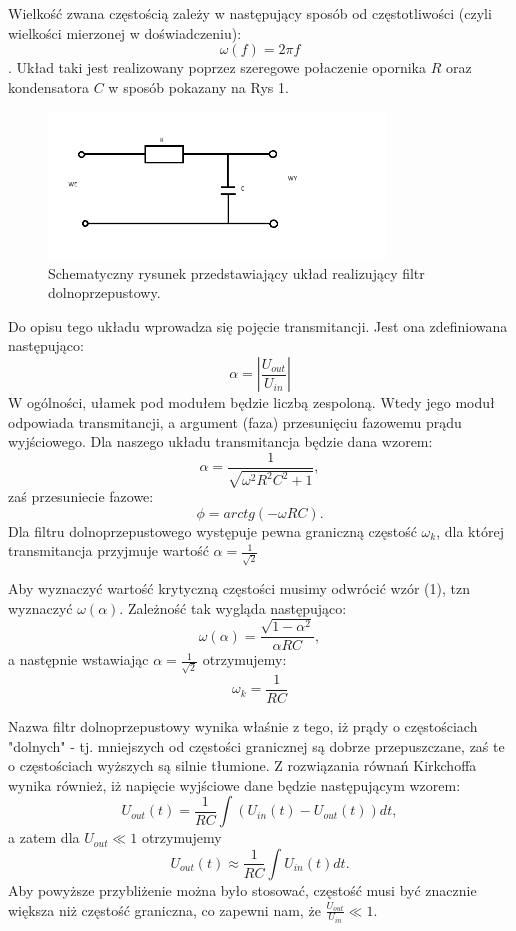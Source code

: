\documentclass[10pt,a4paper]{article}
\begin{document}
Wielkość zwana częstością zależy w następujący sposób od częstotliwości (czyli wielkości mierzonej w doświadczeniu):
$$ \omega (f) = 2 \pi f$$.
Układ taki jest realizowany poprzez szeregowe połaczenie opornika $R$ oraz kondensatora $C$ w sposób pokazany na Rys 1.
\begin{figure}[ht!]	
	\begin{center}
		\includegraphics[width = 0.8\textwidth]{uklad.png}
		\caption{Schematyczny rysunek przedstawiający układ realizujący filtr dolnoprzepustowy.}
	\end{center}
\end{figure}

Do opisu tego układu wprowadza się pojęcie transmitancji. Jest ona zdefiniowana następująco:
$$ \alpha = |\frac{U_{out}}{U_{in}}| $$
W ogólności, ułamek pod modułem będzie liczbą zespoloną. Wtedy jego moduł odpowiada transmitancji, a argument (faza) przesunięciu fazowemu prądu wyjściowego. Dla naszego układu transmitancja będzie dana wzorem:
\begin{equation}
\alpha = \frac{1}{\sqrt{\omega^2R^2C^2 + 1} } ,
\end{equation} 
zaś przesuniecie fazowe:
\begin{equation}
 \phi = arctg(-\omega RC). 
\end{equation}
Dla filtru dolnoprzepustowego występuje pewna graniczną częstość $\omega_k$, dla której transmitancja przyjmuje wartość $\alpha = \frac{1}{\sqrt{2}} $

Aby wyznaczyć wartość krytyczną częstości musimy odwrócić wzór (1), tzn wyznaczyć $\omega (\alpha)$. Zależność tak wygląda następująco:
$$ \omega (\alpha) = \frac{\sqrt{1-\alpha^2}}{\alpha RC}, $$ a następnie 
wstawiając $\alpha = \frac{1}{\sqrt{2}}$ otrzymujemy:
\begin{equation} \omega_k = \frac{1}{RC} \end{equation}


Nazwa filtr dolnoprzepustowy wynika właśnie z tego, iż prądy o częstościach "dolnych" - tj. mniejszych od częstości granicznej są dobrze przepuszczane, zaś te o częstościach wyższych są silnie tłumione.
Z rozwiązania równań Kirkchoffa wynika również, iż napięcie wyjściowe 
dane będzie następującym wzorem:
$$U_{out}(t) = \frac{1}{RC} \int(U_{in}(t) - U_{out}(t)) dt, $$
a zatem dla $U_{out} \ll 1$ otrzymujemy
$$U_{out}(t) \approx \frac{1}{RC} \int U_{in}(t) dt. $$
Aby powyższe przybliżenie można było stosować, częstość musi być znacznie większa niż częstość graniczna, co zapewni nam, że $\frac{U_{out}}{U_{in}} \ll 1. $
\end{document}
